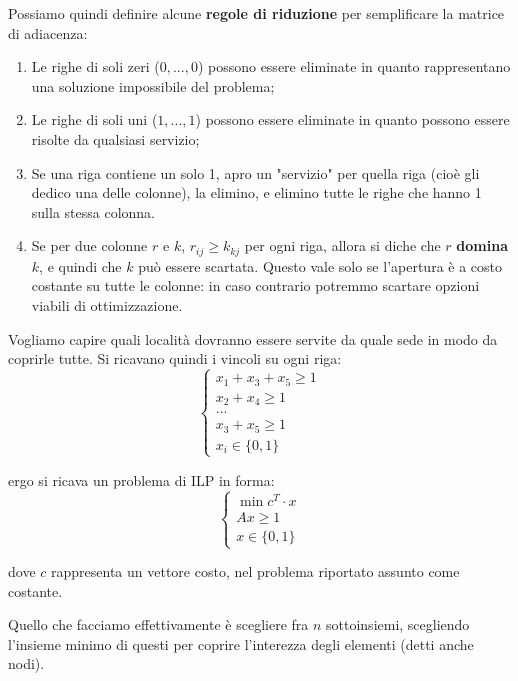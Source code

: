 \documentclass[a4paper,11pt]{article}
\begin{document}
Possiamo quindi definire alcune \textbf{regole di riduzione} per semplificare la  matrice di adiacenza:
\begin{enumerate}
	\item Le righe di soli zeri ($0, ..., 0$) possono essere eliminate in quanto rappresentano una soluzione impossibile del problema;
	\item Le righe di soli uni ($1, ..., 1$) possono essere eliminate in quanto possono essere risolte da qualsiasi servizio; 
	\item Se una riga contiene un solo 1, apro un "servizio" per quella riga (cioè gli dedico una delle colonne), la elimino, e elimino tutte le righe che hanno 1 sulla stessa colonna.
	\item Se per due colonne $r$ e $k$, $r_{ij} \geq k_{kj}$ per ogni riga, allora si diche che $r$ \textbf{domina} $k$, e quindi che $k$ può essere scartata.
		Questo vale solo se l'apertura è a costo costante su tutte le colonne: in caso contrario potremmo scartare opzioni viabili di ottimizzazione. 
\end{enumerate}

	Vogliamo capire quali località dovranno essere servite da quale sede in modo da coprirle tutte. 
Si ricavano quindi i vincoli su ogni riga:
\[
	\begin{cases}
		x_1 + x_3 + x_5 \geq 1 \\
		x_2 + x_4 \geq 1 \\ 
		... \\
		x_3+x_5 \geq 1 \\ 
		x_i \in \{ 0, 1 \}
	\end{cases}
\]

ergo si ricava un problema di ILP in forma:
\[
	\begin{cases}
		\min c^T \cdot x \\ 
		Ax \geq 1 \\ 
		x \in \{ 0, 1 \}
	\end{cases}
\]

dove $c$ rappresenta un vettore costo, nel problema riportato assunto come costante.

Quello che facciamo effettivamente è scegliere fra $n$ sottoinsiemi, scegliendo l'insieme minimo di questi per coprire l'interezza degli elementi (detti anche nodi).
\end{document}
